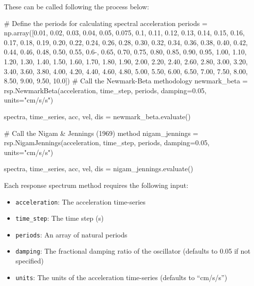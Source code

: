 These can be called following the process below:
\begin{python}
# Define the periods for calculating spectral acceleration
periods = np.array([0.01, 0.02, 0.03, 0.04, 0.05, 0.075, 0.1, 
                    0.11, 0.12, 0.13, 0.14, 0.15, 0.16, 0.17, 
                    0.18, 0.19, 0.20, 0.22, 0.24, 0.26, 0.28,
                    0.30, 0.32, 0.34, 0.36, 0.38, 0.40, 0.42,
                    0.44, 0.46, 0.48, 0.50, 0.55, 0.6-, 0.65,
                    0.70, 0.75, 0.80, 0.85, 0.90, 0.95, 1.00,
                    1.10, 1.20, 1.30, 1.40, 1.50, 1.60, 1.70, 
                    1.80, 1.90, 2.00, 2.20, 2.40, 2.60, 2.80, 
                    3.00, 3.20, 3.40, 3.60, 3.80, 4.00, 4.20,
                    4.40, 4.60, 4.80, 5.00, 5.50, 6.00, 6.50, 
                    7.00, 7.50, 8.00, 8.50, 9.00, 9.50, 10.0])
# Call the Newmark-Beta methodology
newmark_beta = rsp.NewmarkBeta(acceleration,
                               time_step,
                               periods,
                               damping=0.05,
                               units="cm/s/s")

spectra, time_series, acc, vel, dis = newmark_beta.evaluate()

# Call the Nigam & Jennings (1969) method
nigam_jennings = rsp.NigamJennings(acceleration,
                                   time_step,
                                   periods,
                                   damping=0.05,
                                   units="cm/s/s")

spectra, time_series, acc, vel, dis = nigam_jennings.evaluate()
\end{python}

Each response spectrum method requires the following input:
\begin{itemize}
\item \verb=acceleration=: The acceleration time-series
\item \verb=time_step=: The time step (s)
\item \verb=periods=: An array of natural periods
\item \verb=damping=: The fractional damping ratio of the oscillator (defaults to 0.05 if not specified)
\item \verb=units=: The units of the acceleration time-series (defaults to ``cm/s/s'')
\end{itemize}

